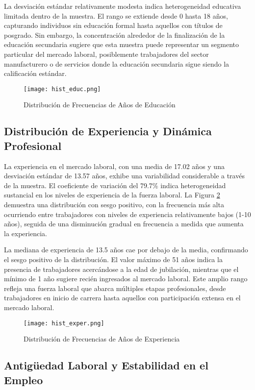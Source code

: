 \documentclass[12pt]{article}
\begin{document}
La desviación estándar relativamente modesta indica heterogeneidad educativa limitada dentro de la muestra. El rango se extiende desde 0 hasta 18 años, capturando individuos sin educación formal hasta aquellos con títulos de posgrado. Sin embargo, la concentración alrededor de la finalización de la educación secundaria sugiere que esta muestra puede representar un segmento particular del mercado laboral, posiblemente trabajadores del sector manufacturero o de servicios donde la educación secundaria sigue siendo la calificación estándar.

\begin{figure}[H]
\centering
\texttt{[image: hist\_educ.png]}
\caption{Distribución de Frecuencias de Años de Educación}
\label{fig:hist_educ}
\end{figure}

\subsection{Distribución de Experiencia y Dinámica Profesional}

La experiencia en el mercado laboral, con una media de 17.02 años y una desviación estándar de 13.57 años, exhibe una variabilidad considerable a través de la muestra. El coeficiente de variación del 79.7\% indica heterogeneidad sustancial en los niveles de experiencia de la fuerza laboral. La Figura \ref{fig:hist_exper} demuestra una distribución con sesgo positivo, con la frecuencia más alta ocurriendo entre trabajadores con niveles de experiencia relativamente bajos (1-10 años), seguida de una disminución gradual en frecuencia a medida que aumenta la experiencia.

La mediana de experiencia de 13.5 años cae por debajo de la media, confirmando el sesgo positivo de la distribución. El valor máximo de 51 años indica la presencia de trabajadores acercándose a la edad de jubilación, mientras que el mínimo de 1 año sugiere recién ingresados al mercado laboral. Este amplio rango refleja una fuerza laboral que abarca múltiples etapas profesionales, desde trabajadores en inicio de carrera hasta aquellos con participación extensa en el mercado laboral.

\begin{figure}[H]
\centering
\texttt{[image: hist\_exper.png]}
\caption{Distribución de Frecuencias de Años de Experiencia}
\label{fig:hist_exper}
\end{figure}

\subsection{Antigüedad Laboral y Estabilidad en el Empleo}
\end{document}
